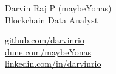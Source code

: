 \begin{center}
    \begin{minipage}[b]{0.5\textwidth}
            \flushleft
            {\huge Darvin Raj P}  {\color{UI_blue}\Large{(maybeYonas)}} \\ %
            \vspace{0.1cm}
            {\color{UI_blue} \Large{Blockchain Data Analyst}} \\
    \end{minipage}%
    \begin{minipage}[b]{0.5\textwidth}
            \flushright \large  %
            {\href{https://github.com/darvinrio}{github.com/darvinrio} } \\
            \href{https://www.dune.com/maybeYonas}{dune.com/maybeYonas}
            \\
            \href{https://www.linkedin.com/in/darvinrio/}{linkedin.com/in/darvinrio}
    \end{minipage}   
    
\end{center}